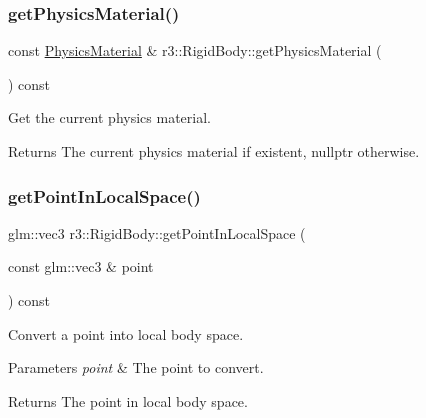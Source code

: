 \subsubsection{\texorpdfstring{get\+Physics\+Material()}{getPhysicsMaterial()}}
{\footnotesize\ttfamily const \mbox{\hyperlink{classr3_1_1_physics_material}{Physics\+Material}} \& r3\+::\+Rigid\+Body\+::get\+Physics\+Material (\begin{DoxyParamCaption}{ }\end{DoxyParamCaption}) const}



Get the current physics material. 

\begin{DoxyReturn}{Returns}
The current physics material if existent, nullptr otherwise. 
\end{DoxyReturn}
\mbox{\label{classr3_1_1_rigid_body_a23b72178cb04117c3b016218fefff835}} 
\subsubsection{\texorpdfstring{get\+Point\+In\+Local\+Space()}{getPointInLocalSpace()}}
{\footnotesize\ttfamily glm\+::vec3 r3\+::\+Rigid\+Body\+::get\+Point\+In\+Local\+Space (\begin{DoxyParamCaption}\item[{const glm\+::vec3 \&}]{point }\end{DoxyParamCaption}) const}



Convert a point into local body space. 


\begin{DoxyParams}{Parameters}
{\em point} & The point to convert. \\
\hline
\end{DoxyParams}
\begin{DoxyReturn}{Returns}
The point in local body space. 
\end{DoxyReturn}
\mbox{\label{classr3_1_1_rigid_body_a1d694ab55e5846af2d5a184b2be4c523}} 
